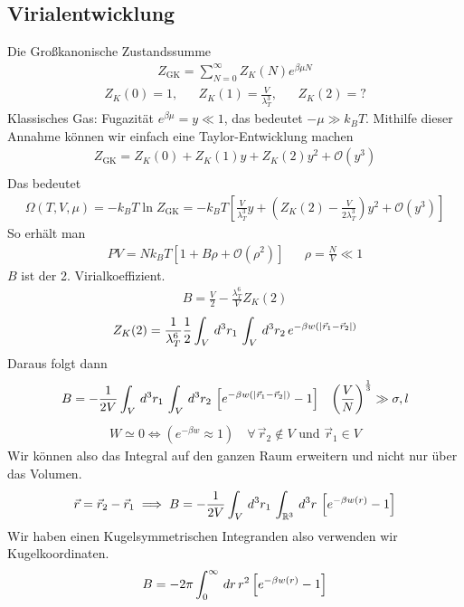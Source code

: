 \subsection*{Virialentwicklung}
Die Gro\ss{}kanonische Zustandssumme
%
\begin{align*}
  Z_\text{GK} = \sum_{N=0}^{\infty} Z_K(N) e^{\beta \mu N}
\end{align*}
%
%
\begin{align*}
  Z_K(0) = 1, && Z_K(1) = \frac{V}{\lambda_T^3}, && Z_K(2) = ? 
\end{align*}
%
Klassisches Gas: Fugazit\"at $e^{\beta\mu} = y \ll 1$, das bedeutet
$-\mu \gg k_B T$. Mithilfe dieser Annahme k\"onnen wir einfach eine Taylor-Entwicklung
machen
%
\begin{align*}
  Z_\text{GK} = Z_K(0) + Z_K(1) y + Z_K(2)y^2 + \mathcal{O}(y^3) \\
\end{align*}
%
Das bedeutet 
%
\begin{align*}
  \Omega(T, V, \mu) = - k_B T \ln{ Z_\text{GK}} = -k_B T \left[ 
  \frac{V}{\lambda_T^3} y + \left( Z_K(2) - \frac{V}{2 \lambda^3_T} \right) y ^2 
+ \mathcal{O}(y^3)\right]
\end{align*}
%
So erh\"alt man
%
\begin{align*}
  PV = N k_B T \left[ 1+ B \rho + \mathcal{O}(\rho^2) \right] && \rho= \frac{N}{V} \ll 1
\end{align*}
%
$B$ ist der 2. Virialkoeffizient. 
%
\begin{align*}
  B = \frac{V}{2} - \frac{\lambda_T^6 }{V} Z_K(2)
\end{align*}
%
%
\begin{align*}
  Z_K(2) = \frac{1}{\lambda_T^6} 
  \frac{1}{2} \int_{V}^{} \,d^3 r_1\, \int_{V}^{} \,d^3r_2\, e^{-\beta w(\left| \vec{r}_1 - \vec{r}_2 \right|)}
\end{align*}
%
Daraus folgt dann
%
\begin{align*}
  B = - \frac{1}{2V} \int_{V}^{} \,d^3 r_1\, \int_{V}^{} \,d^3 r_2\, 
  \left[ e^{-\beta w ( \left| \vec{r}_1 - \vec{r}_2 \right|)} - 1 \right] && \left( \frac{V}{N} \right)^{\frac{1}{3}} \gg \sigma, l
\end{align*}
%
\begin{align*}
  W \simeq 0 \iff (e^{-\beta w} \approx 1) \quad\forall\, \vec{r}_2 \notin V
  \text{ und } \vec{r}_1 \in V
\end{align*}
%
Wir k\"onnen also das Integral auf den ganzen Raum erweitern und
nicht nur \"uber das Volumen.
%
\begin{align*}
  \vec{r} = \vec{r}_2 - \vec{r}_1 \implies B = - \frac{1}{2V} \int_{V}^{} \,d^3 r_1\,
  \int_{\mathbb{R}^3}^{} \,d^3 r\, \left[ e^{-\beta w(r)} - 1 \right]
\end{align*}
%
Wir haben einen Kugelsymmetrischen Integranden also verwenden wir Kugelkoordinaten.
%
\begin{align*}
  B = - 2 \pi \int_{0}^{\infty} \,dr\, r^2 \left[  e^{-\beta w(r)} - 1 \right]
\end{align*}
%

